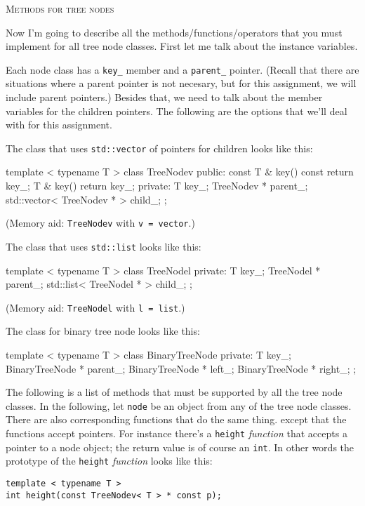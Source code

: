 \textsc{Methods for tree nodes}

Now I'm going to describe all the methods/functions/operators
that you must implement for all tree node classes.
First let me talk about the instance variables.

Each node class has a \verb!key_! member and a \verb!parent_! 
pointer. (Recall that there are situations where a parent pointer
is not necesary, but for this assignment, we will include parent
pointers.)
Besides that, we need to talk about the member variables
for the children pointers.
The following are the options that we'll deal with for this assignment.

The class that uses \verb!std::vector! of pointers for children looks like
this:
\begin{console}[commandchars=\~\!\@,fontsize=\footnotesize]
template < typename T >
class TreeNodev
{
public:
    const T & key() const
    {
        return key_;
    }
    T & key()
    {
        return key_;
    }
private:
    T key_;
    TreeNodev * parent_;
    std::vector< TreeNodev * > child_;
};
\end{console}
(Memory aid: \verb!TreeNodev! with \verb!v = vector!.)

The class that uses \verb!std::list! looks like this:
\begin{console}[fontsize=\footnotesize]
template < typename T >
class TreeNodel
{
private:
    T key_;
    TreeNodel * parent_;
    std::list< TreeNodel * > child_;
};
\end{console}
(Memory aid: \verb!TreeNodel! with \verb!l = list!.)

The class for binary tree node looks like this:
\begin{console}[fontsize=\footnotesize]
template < typename T >
class BinaryTreeNode
{
private:
    T key_;
    BinaryTreeNode * parent_;
    BinaryTreeNode * left_;
    BinaryTreeNode * right_;
};
\end{console}

The following is a list of methods that must be supported by
all the tree node classes.
In the following, let \verb!node! be an object
from any of the tree node classes.
There are also corresponding functions that do the same thing.
except that the functions accept pointers. For instance there's a
\verb!height! \textit{function} that accepts a pointer to a node object;
the return value is of course an \verb!int!.
In other words the prototype of the \verb!height! \textit{function} 
looks like this:
\begin{Verbatim}[frame=single,fontsize=\footnotesize]
template < typename T >
int height(const TreeNodev< T > * const p);
\end{Verbatim}


